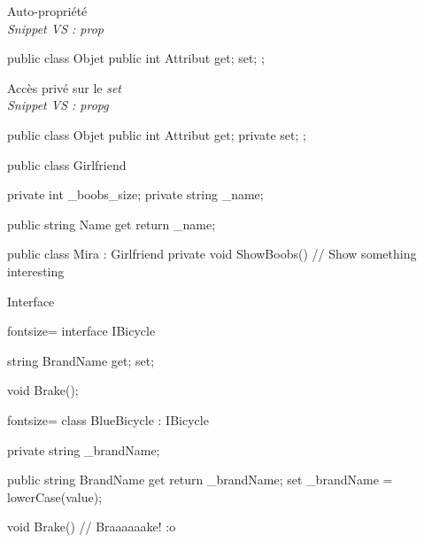 \begin{frame}[fragile]
    \begin{center}
        {\large Auto-propriété}\\
        \emph{\scriptsize Snippet VS : prop}
    \end{center}
    \begin{csharpcode}
public class Objet
{
    public int Attribut { get; set; };
}
    \end{csharpcode}
    \pause
    \begin{center}
        {\large Accès privé sur le \emph{set}}\\
        \emph{\scriptsize Snippet VS : propg}
    \end{center}
    \begin{csharpcode}
public class Objet
{
    public int Attribut { get; private set; };
}
    \end{csharpcode}
\end{frame}

\begin{frame}[fragile]
  \begin{csharpcode}
public class Girlfriend
{
    private int _boobs_size;
    private string _name;

    public string Name {
        get { return _name; }
    }
}
  \end{csharpcode}
  \pause
  \begin{csharpcode}
public class Mira : Girlfriend
{
    private void ShowBoobs() {
        // Show something interesting
    }
}
  \end{csharpcode}
\end{frame}

\begin{frame}[fragile]
    \begin{center}{\large Interface}\end{center}
    \begin{csharpcode*}{fontsize=\scriptsize}
interface IBicycle
{
     string BrandName { get; set; }

     void Brake();
}
    \end{csharpcode*}
    \pause
    \begin{csharpcode*}{fontsize=\scriptsize}
class BlueBicycle : IBicycle
{
    private string _brandName;

    public string BrandName {
        get { return _brandName; }
        set { _brandName = lowerCase(value); }
    }

    void Brake() {
        // Braaaaaake! :o
    }
}
    \end{csharpcode*}
\end{frame}

